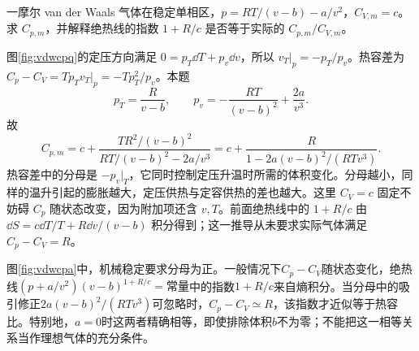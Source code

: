 \begin{example}
一摩尔 van der Waals 气体在稳定单相区，$p=RT/(v-b)-a/v^2$，$C_{V,m}=c$。求 $C_{p,m}$，并解释绝热线的指数 $1+R/c$ 是否等于实际的 $C_{p,m}/C_{V,m}$。
\end{example}
\begin{solution}
图\ref{fig:vdwcpq}的定压方向满足 $0=p_T\dd T+p_v\dd v$，所以 $v_T|_p=-p_T/p_v$。热容差为 $C_p-C_V=Tp_Tv_T|_p=-Tp_T^2/p_v$。本题
\[
 p_T=\frac R{v-b},\qquad
 p_v=-\frac{RT}{(v-b)^2}+\frac{2a}{v^3}.
\]
故
\[
 C_{p,m}=c+\frac{TR^2/(v-b)^2}{RT/(v-b)^2-2a/v^3}
 =c+\frac R{1-2a(v-b)^2/(RTv^3)}.
\]
热容差中的分母是 $-p_v|_T$，它同时控制定压升温时所需的体积变化。分母越小，同样的温升引起的膨胀越大，定压供热与定容供热的差也越大。这里 $C_V=c$ 固定不妨碍 $C_p$ 随状态改变，因为附加项还含 $v,T$。前面绝热线中的 $1+R/c$ 由 $\dd S=c\dd T/T+R\dd v/(v-b)$ 积分得到；这一推导从未要求实际气体满足 $C_p-C_V=R$。

图\ref{fig:vdwcpa}中，机械稳定要求分母为正。一般情况下$C_p-C_V$随状态变化，绝热线$(p+a/v^2)(v-b)^{1+R/c}=\text{常量}$中的指数$1+R/c$来自熵积分。当分母中的吸引修正$2a(v-b)^2/(RTv^3)$可忽略时，$C_p-C_V\simeq R$，该指数才近似等于热容比。特别地，$a=0$时这两者精确相等，即使排除体积$b$不为零；不能把这一相等关系当作理想气体的充分条件。
\end{solution}

